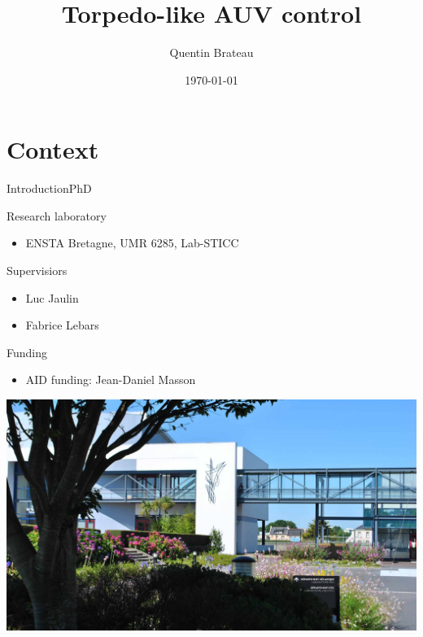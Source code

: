 \documentclass[10pt, xcolor={usenames, dvipsnames}]{beamer}
\title{Torpedo-like AUV control}
\date{\today}
\author{Quentin Brateau}
\institute{ENSTA Bretagne}
\begin{document}
    \maketitle

    \section{Context}

        \begin{frame}{Introduction}{PhD}
            \centering
            \begin{minipage}[c]{0.58\textwidth}
                \begin{block}{Research laboratory}
                    \vspace{0.2cm}
                    \begin{itemize}
                        \item ENSTA Bretagne, UMR 6285, Lab-STICC
                    \end{itemize}
                \end{block}

                \begin{block}{Supervisiors}
                    \begin{itemize}
                        \item Luc Jaulin
                        \item Fabrice Lebars
                    \end{itemize}
                \end{block}

                \begin{block}{Funding}
                    \begin{itemize}
                        \item AID funding: Jean-Daniel Masson
                    \end{itemize}
                \end{block}
            \end{minipage}
            \hfill
            \begin{minipage}[c]{0.4\textwidth}
                \includegraphics[height=0.7\textheight, trim={24cm 0 16cm 0}, clip]{imgs/ensta.jpg}
            \end{minipage}
        \end{frame}
\end{document}
